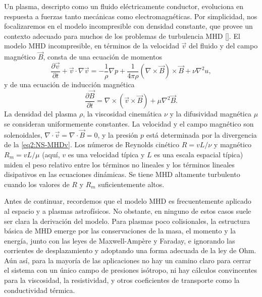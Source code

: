 Un plasma, descripto como un fluido eléctricamente conductor,
evoluciona en respuesta a fuerzas tanto mecánicas como
electromagnéticas. Por simplicidad, nos focalizaremos en el modelo
incompresible con densidad constante, que provee un contexto adecuado
para muchos de los problemas de turbulencia MHD
[\cite{biskamp_magnetohydrodynamic_2003}]. El modelo MHD incompresible,
en términos de la velocidad $\vec{v}$ del fluido y del campo magnético
$\vec{B}$, consta de una ecuación de momentos
\begin{equation}\label{eq2:NS-MHDv}
  \frac{\partial \vec{v}}{\partial t} + \vec{v} \cdot \nabla\vec{v} = -\frac{1}{\rho} \nabla p + \frac{1}{4\pi\rho} \left(\nabla\times\vec{B}\right)\times\vec{B} + \nu \nabla^2 u,
\end{equation}
y de una ecuación de inducción magnética
\begin{equation}\label{eq2:NS-MHDB}
  \frac{\partial \vec{B}}{\partial t} = \nabla \times \left(\vec{v}\times\vec{B}\right) + \mu \nabla^2 \vec{B}.
\end{equation}
La densidad del plasma $\rho$, la viscosidad cinemática $\nu$ y la
difusividad magnética $\mu$ se consideran uniformemente constantes. La
velocidad y el campo magnético son solenoidales, $\nabla\cdot\vec{v}
= \nabla\cdot\vec{B} = 0$, y la presión $p$ está determinada por la
divergencia de la \cref{eq2:NS-MHDv}. Los números de Reynolds cinético
$R = vL/\nu$ y magnético $R_m = vL/\mu$ (aquí, $v$ es una velocidad
típica y $L$ es una escala espacial típica) miden el peso relativo
entre los términos no lineales y los términos lineales disipativos en
las ecuaciones dinámicas. Se tiene MHD altamente turbulento cuando los
valores de $R$ y $R_m$ suficientemente altos.

Antes de continuar, recordemos que el modelo MHD es frecuentemente
aplicado al espacio y a plasmas astrofísicos. No obstante, en ninguno
de estos casos suele ser clara la derivación del modelo. Para plasmas
poco colisionales, la estructura básica de MHD emerge por las
conservaciones de la masa, el momento y la energía, junto con las
leyes de Maxwell-Ampère y Faraday, e ignorando las corrientes de
desplazamiento y adoptando una forma adecuada de la ley de Ohm. Aún
así, para la mayoría de las aplicaciones no hay un camino claro para
cerrar el sistema con un único campo de presiones isótropo, ni hay
cálculos convincentes para la viscosidad, la resistividad, y otros
coeficientes de transporte como la conductividad térmica.

